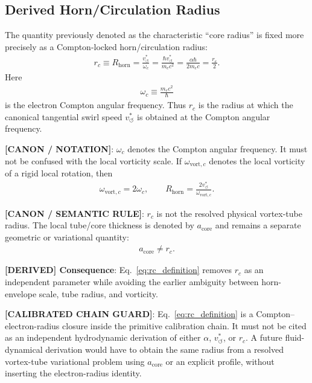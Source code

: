 \documentclass[11pt]{article}
\theoremstyle{definition}
\theoremstyle{plain}
\theoremstyle{remark}
\newcommand{\rc}{{r_c}}
\newcommand{\vchar}{v_{\!\boldsymbol{\circlearrowleft}}^{\ast}}
\begin{document}
    \subsection{Derived Horn/Circulation Radius}
        \label{subsec:derived_horn_circulation_radius}

        The quantity previously denoted as the characteristic ``core radius'' is fixed more precisely as a
        Compton-locked horn/circulation radius:
        \begin{align}
            \rc \equiv R_{\mathrm{horn}}
            = \frac{\vchar}{\omega_c}
            = \frac{\hbar\vchar}{m_e c^2}
            = \frac{\alpha\hbar}{2m_e c}
            = \frac{r_e}{2}.
            \label{eq:rc_definition}
        \end{align}
        Here
        \begin{align}
            \omega_c \equiv \frac{m_e c^2}{\hbar}
            \label{eq:omega_c_compton}
        \end{align}
        is the electron Compton angular frequency. Thus $\rc$ is the radius at which the canonical
        tangential swirl speed $\vchar$ is obtained at the Compton angular frequency.

        \textbf{[CANON / NOTATION]}: $\omega_c$ denotes the Compton angular frequency. It must not be confused with the local vorticity scale. If $\omega_{\mathrm{vort},c}$ denotes the local vorticity of a rigid local rotation, then
        \begin{align}
            \omega_{\mathrm{vort},c}=2\omega_c,
            \qquad
            R_{\mathrm{horn}}=\frac{2\vchar}{\omega_{\mathrm{vort},c}}.
        \end{align}

        \textbf{[CANON / SEMANTIC RULE]}: $\rc$ is not the resolved physical vortex-tube radius. The local tube/core thickness is denoted by $a_{\mathrm{core}}$ and remains a separate geometric or variational quantity:
        \begin{align}
            a_{\mathrm{core}} \neq \rc.
        \end{align}

        \textbf{[DERIVED] Consequence}: Eq.~\eqref{eq:rc_definition} removes $\rc$ as an independent parameter while avoiding the earlier ambiguity between horn-envelope scale, tube radius, and vorticity.

        \textbf{[CALIBRATED CHAIN GUARD]}: Eq.~\eqref{eq:rc_definition} is a Compton--electron-radius closure inside the primitive calibration chain. It must not be cited as an independent hydrodynamic derivation of either $\alpha$, $\vchar$, or $\rc$. A future fluid-dynamical derivation would have to obtain the same radius from a resolved vortex-tube variational problem using $a_{\mathrm{core}}$ or an explicit profile, without inserting the electron-radius identity.
    
\end{document}
